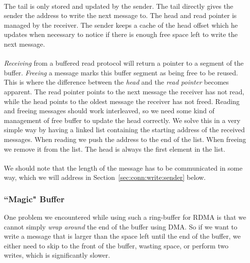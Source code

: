 \paragraph{} The tail is only stored and updated by the sender. The tail directly gives the sender the address to write the 
next message to. The head and read pointer is managed by the receiver. The sender keeps a cache of the head offset which he
updates when necessary to notice if there is enough free space left to write the next message.

\paragraph{}\emph{Receiving} from a buffered read protocol will 
return a pointer to a segment of the buffer. \emph{Freeing} a message marks this buffer segment as being free to be reused.
This is where the difference between the \emph{head} and the \emph{read pointer} becomes apparent. The read pointer points 
to the next message the receiver has not read, while the head points to the oldest message the receiver has not freed. Reading
and freeing messages should work interleaved, so we need some kind of management of free buffer to update the head 
correctly. We solve this in a very simple way by having a linked list containing the starting address of the received messages.
When reading we push the address to the end of the list. When freeing we remove it from the list. The head is always the first 
element in the list.

\paragraph{}We should note that the length of the message has to be communicated in some way, which we will address in  
Section~\ref{sec:conn:write:sender} below.





\subsubsection{``Magic" Buffer} 

One problem we encountered while using such a ring-buffer for RDMA is that we cannot simply 
\emph{wrap around} the end of the buffer using DMA. So if we want to write a message that is larger than the space left until
the end of the buffer, we either need to skip to the front of the buffer, wasting space, or perform two writes, which is 
significantly slower.

